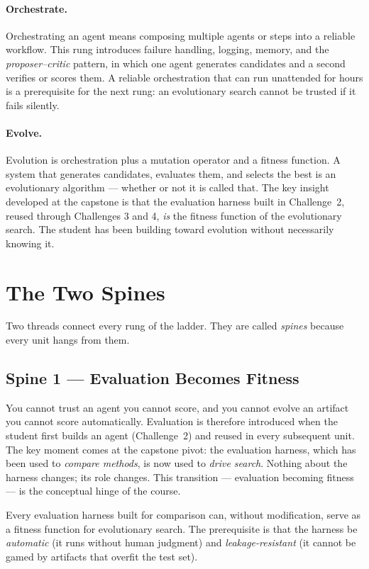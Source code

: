 \paragraph{Orchestrate.}
Orchestrating an agent means composing multiple agents or steps into a reliable workflow.
This rung introduces failure handling, logging, memory, and the \emph{proposer–critic} pattern, in which one agent generates candidates and a second verifies or scores them.
A reliable orchestration that can run unattended for hours is a prerequisite for the next rung: an evolutionary search cannot be trusted if it fails silently.

\paragraph{Evolve.}
Evolution is orchestration plus a mutation operator and a fitness function.
A system that generates candidates, evaluates them, and selects the best is an evolutionary algorithm — whether or not it is called that.
The key insight developed at the capstone is that the evaluation harness built in Challenge~2, reused through Challenges 3 and 4, \emph{is} the fitness function of the evolutionary search.
The student has been building toward evolution without necessarily knowing it.

\section{The Two Spines}
\label{section:TwoSpines}

Two threads connect every rung of the ladder.
They are called \emph{spines} because every unit hangs from them.

\subsection{Spine 1 — Evaluation Becomes Fitness}

You cannot trust an agent you cannot score, and you cannot evolve an artifact you cannot score automatically.
Evaluation is therefore introduced when the student first builds an agent (Challenge~2) and reused in every subsequent unit.
The key moment comes at the capstone pivot: the evaluation harness, which has been used to \emph{compare methods}, is now used to \emph{drive search}.
Nothing about the harness changes; its role changes.
This transition — evaluation becoming fitness — is the conceptual hinge of the course.

\begin{principle}
\label{principle:EvalFitness}
Every evaluation harness built for comparison can, without modification, serve as a fitness function for evolutionary search.
The prerequisite is that the harness be \emph{automatic} (it runs without human judgment) and \emph{leakage-resistant} (it cannot be gamed by artifacts that overfit the test set).
\end{principle}

